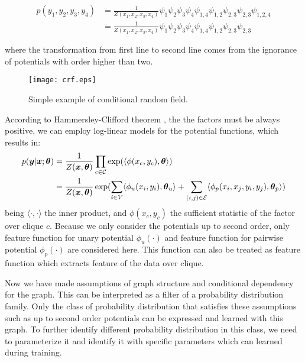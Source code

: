 \[
\begin{aligned}
p(y_1, y_2, y_3, y_4) &= \frac{1}{Z(x_1, x_2, x_3, x_4)}\psi_1\psi_2\psi_3\psi_4\psi_{1,4}\psi_{1,2}\psi_{2,3}\psi_{2,3}\psi_{1,2,4} \\
&=\frac{1}{Z(x_1, x_2, x_3, x_4)}\psi_1\psi_2\psi_3\psi_4\psi_{1,4}\psi_{1,2}\psi_{2,3}\psi_{2,3}
\end{aligned}
\]

where the transformation from first line to second line comes from the ignorance of potentials with order higher than two.
\begin{figure}[H]
	\begin{center}
		\texttt{[image: crf.eps]}
		\caption{Simple example of conditional random field.}		
		\label{crf}
	\end{center}
\end{figure} 
According to Hammersley-Clifford theorem \cite{hammersley1968markov}, the the factors must be always positive, we can employ log-linear models for the potential functions, which results in:
\begin{equation}
\label{crf_potential}
\begin{aligned}
p(\boldsymbol y | \boldsymbol x; \boldsymbol \theta) &= \frac{1}{Z(\boldsymbol x, \boldsymbol \theta)}\prod_{c\in \mathcal{C}}\exp(\langle\phi(x_c, y_c), \boldsymbol \theta\rangle)\\
&=\frac{1}{Z(\boldsymbol x, \boldsymbol \theta)}\exp(\sum_{i\in V}\langle\phi_u(x_i, y_i), \boldsymbol{\theta}_u\rangle + \sum_{(i,j)\in \mathcal{E}}\langle\phi_p(x_i, x_j, y_i, y_j), \boldsymbol{\theta}_p\rangle)
\end{aligned}
\end{equation}
being $\langle \cdot, \cdot \rangle$ the inner product, and $\phi(x_c, y_c)$ the sufficient statistic of the factor over clique $c$. Because we only consider the potentials up to second order, only feature function for unary potential $\phi_u(\cdot)$ and feature function for pairwise potential $\phi_p(\cdot)$ are considered here. This function can also be treated as feature function which extracts feature of the data over clique. 

Now we have made assumptions of graph structure and conditional dependency for the graph. This can be interpreted as a filter of a probability distribution family. Only the class of probability distribution that satisfies these assumptions such as up to second order potentials can be expressed and learned with this graph. To further identify different probability distribution in this class, we need to parameterize it and identify it with specific parameters which can learned during training. 

